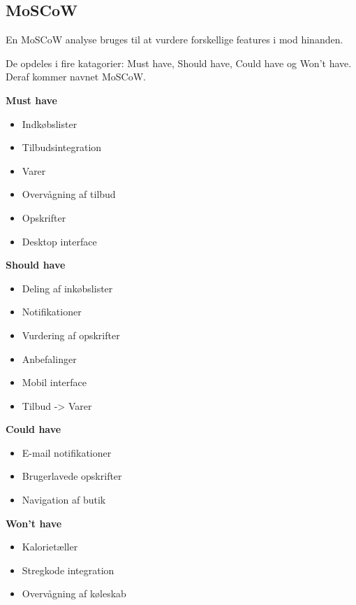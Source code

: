 \subsection{MoSCoW}
En MoSCoW analyse bruges til at vurdere forskellige features i mod hinanden. %

De opdeles i fire katagorier: Must have, Should have, Could have og Won't have.
Deraf kommer navnet MoSCoW.

\noindent\parbox[t]{2.7in}{\raggedright
	\textbf{Must have}
	\begin{itemize}
			\item Indkøbslister
			\item Tilbudsintegration
			\item Varer
			\item Overvågning af tilbud
			\item Opskrifter
			\item Desktop interface
	\end{itemize}
}
\parbox[t]{2.7in}{\raggedright%
	\textbf{Should have}
	\begin{itemize}
		\item Deling af inkøbslister
		\item Notifikationer
		\item Vurdering af opskrifter
		\item Anbefalinger
		\item Mobil interface
		\item Tilbud -> Varer
	\end{itemize}
}

\noindent\parbox[t]{2.7in}{\raggedright
	\textbf{Could have}
	\begin{itemize}
			\item E-mail notifikationer
			\item Brugerlavede opskrifter
			\item Navigation af butik
	\end{itemize}
}
\parbox[t]{2.7in}{\raggedright%
	\textbf{Won't have}
	\begin{itemize}
		\item Kalorietæller
		\item Stregkode integration
		\item Overvågning af køleskab
	\end{itemize}
}

